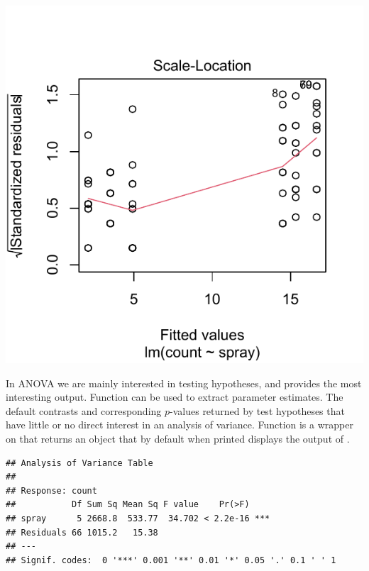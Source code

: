 \documentclass[krantz2]{krantz}\usepackage{knitr}
\begin{document}
\begin{knitrout}\footnotesize
{}\color{fgcolor}\begin{kframe}
\begin{alltt}
  \hlstd{=} \hlstd{)}
\end{alltt}
\end{kframe}

{\centering \includegraphics[width=.54\textwidth]{figure/pos-model-6a-1} 

}



\end{knitrout}

In ANOVA we are mainly interested in testing hypotheses, and  provides the most interesting output. Function  can be used to extract parameter estimates. The default contrasts and corresponding $p$-values returned by  test hypotheses that have little or no direct interest in an analysis of variance. Function  is a wrapper on  that returns an object that by default when printed displays the output of .

\begin{knitrout}\footnotesize
{}\color{fgcolor}\begin{kframe}
\begin{alltt}
\end{alltt}
\begin{verbatim}
## Analysis of Variance Table
## 
## Response: count
##           Df Sum Sq Mean Sq F value    Pr(>F)    
## spray      5 2668.8  533.77  34.702 < 2.2e-16 ***
## Residuals 66 1015.2   15.38                      
## ---
## Signif. codes:  0 '***' 0.001 '**' 0.01 '*' 0.05 '.' 0.1 ' ' 1
\end{verbatim}
\end{kframe}
\end{knitrout}
\end{document}
